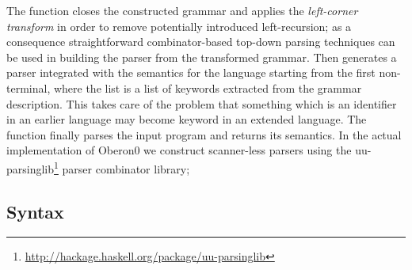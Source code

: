 The function  closes the constructed grammar and applies the \emph{left-corner transform} in order to remove potentially introduced left-recursion; 
as a consequence straightforward combinator-based top-down parsing techniques can be used in building the parser from the transformed grammar. 
Then  generates a parser integrated with the semantics for the language starting from the first non-terminal,
where the list  is a list of keywords extracted from the grammar description. 
This takes care of the problem that something which is an identifier in an earlier language may become keyword in an extended  language. 
The function  finally  parses the input program and returns its semantics.
In the actual implementation of Oberon0 we construct scanner-less parsers using the uu-parsinglib\footnote{\url{http://hackage.haskell.org/package/uu-parsinglib}} parser combinator library;

\subsection{Syntax}


